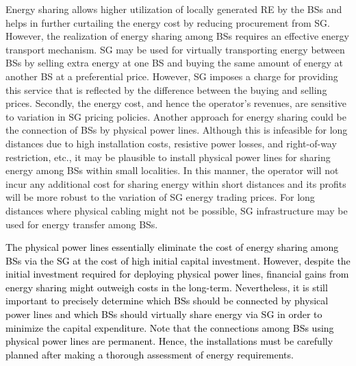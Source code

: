 \documentclass[10pt, letter,twocolumn]{IEEEtran}
\begin{document}
Energy sharing allows higher utilization of locally generated RE by the BSs and helps in further curtailing the energy cost by reducing procurement from SG. However, the realization of energy sharing among BSs requires an effective energy transport mechanism. SG may be used for virtually transporting energy between BSs by selling extra energy at one BS and buying the same amount of energy at another BS at a preferential price. However, SG imposes a charge for providing this service that is reflected by the difference between the buying and selling prices. Secondly, the energy cost, and hence the operator's revenues, are sensitive to variation in SG pricing policies. Another approach for energy sharing could be the connection of BSs by physical power lines. Although this is infeasible for long distances due to high installation costs, resistive power losses, and right-of-way restriction, etc., it may be plausible to install physical power lines for sharing energy among BSs within small localities. In this manner, the operator will not incur any additional cost for sharing energy within short distances and its profits will be more robust to the variation of SG energy trading prices. For long distances where physical cabling might not be possible, SG infrastructure may be used for energy transfer among BSs.

\textcolor{black}{The physical power lines essentially eliminate the cost of energy sharing among BSs via the SG at the cost of high initial capital investment. However, despite the initial investment required for deploying physical power lines, financial gains from energy sharing might outweigh costs in the long-term. Nevertheless, it is still important to precisely determine which BSs should be connected by physical power lines and which BSs should virtually share energy via SG in order to minimize the capital expenditure. Note that the connections among BSs using physical power lines are permanent. Hence, the installations must be carefully planned after making a thorough assessment of energy requirements.}
\end{document}
